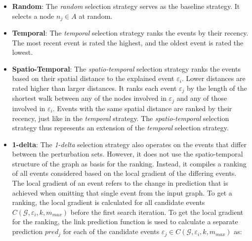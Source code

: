 \begin{itemize}
    \item \textbf{Random}: The \textit{random} selection strategy serves as the baseline strategy. It selects a node $n_j \in A$ at random.
    \item \textbf{Temporal}: The \textit{temporal} selection strategy ranks the events by their recency. The most recent event is rated the highest, and the oldest event is rated the lowest.
    \item \textbf{Spatio-Temporal}: The \textit{spatio-temporal} selection strategy ranks the events based on their spatial distance to the explained event $\varepsilon_i$. Lower distances are rated higher than larger distances. It ranks each event $\varepsilon_j$ by the length of the shortest walk between any of the nodes involved in $\varepsilon_j$ and any of those involved in $\varepsilon_i$. Events with the same spatial distance are ranked by their recency, just like in the \textit{temporal} strategy. The \textit{spatio-temporal} selection strategy thus represents an extension of the \textit{temporal} selection strategy.
    \item \textbf{1-delta}: The \textit{1-delta} selection strategy also operates on the events that differ between the perturbation sets. However, it does not use the spatio-temporal structure of the graph as basis for the ranking. Instead, it compiles a ranking of all events considered based on the local gradient of the differing events. The local gradient of an event refers to the change in prediction that is achieved when omitting that single event from the input graph. To get a ranking, the local gradient is calculated for all candidate events  $C(\mathcal{G}, \varepsilon_i, k, m_{max})$ before the first search iteration. To get the local gradient for the ranking, the link prediction function is used to calculate a separate prediction $pred_j$ for each of the candidate events $\varepsilon_j \in C(\mathcal{G}, \varepsilon_i, k, m_{max})$ as:

\end{itemize}
